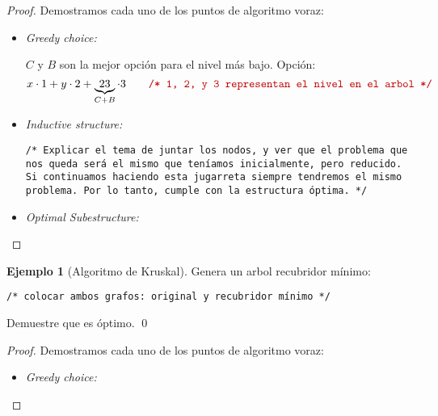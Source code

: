 \documentclass[english, spanish, fleqn, 10pt]{article}
\newcommand{\comentarioc}[1]{\texttt{\textcolor{webred}{/* #1 */}}}
\numberwithin{equation}{section}
\theoremstyle{definition}
\newtheorem{beforeExample}{Ejemplo}[section]
\newenvironment{ejemplo}[1][]{\begin{beforeExample}[#1]\renewcommand{\qedsymbol}{$\blacksquare$}}{\qed\end{beforeExample}}
\begin{document}
\begin{proof}
	Demostramos cada uno de los puntos de algoritmo voraz:
	\begin{itemize}
		\item \emph{Greedy choice:}
		
		$C$ y $B$ son la mejor opción para el nivel más bajo. Opción:
		\begin{equation*}
		x\cdot 1+y\cdot 2+\underbrace{23}_{C+B}\cdot 3\qquad\comentarioc{1, 2, y 3 representan el nivel en el arbol}
		\end{equation*}
		
		\item \emph{Inductive structure:}
		
		\comentarioc{Explicar el tema de juntar los nodos, y ver que el problema que nos queda será el mismo que teníamos inicialmente, pero reducido. Si continuamos haciendo esta jugarreta siempre tendremos el mismo problema. Por lo tanto, cumple con la estructura óptima.}
		
		\item \emph{Optimal Subestructure:}
		
	\end{itemize}
\end{proof}

\begin{ejemplo}[Algoritmo de Kruskal]
	Genera un arbol recubridor mínimo:
	\begin{center}
		\comentarioc{colocar ambos grafos: original y recubridor mínimo}
	\end{center}
	Demuestre que es óptimo.
\end{ejemplo}
\begin{proof}
	Demostramos cada uno de los puntos de algoritmo voraz:
	\begin{itemize}
		\item \emph{Greedy choice:}
	\end{itemize}
\end{proof}
\end{document}
